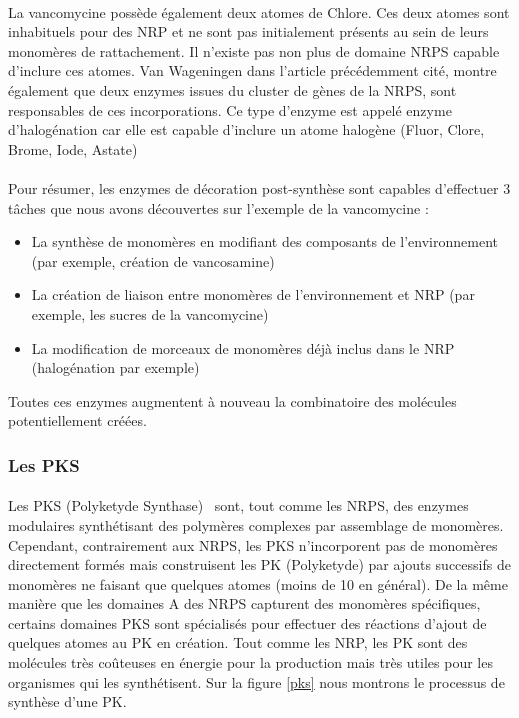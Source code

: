 \documentclass[12pt,french,twoside]{report}
\begin{document}
\paragraph{}La vancomycine possède également deux atomes de Chlore.
Ces deux atomes sont inhabituels pour des NRP et ne sont pas initialement présents au sein de leurs monomères de rattachement.
Il n'existe pas non plus de domaine NRPS capable d'inclure ces atomes.
Van Wageningen dans l'article précédemment cité, montre également que deux enzymes issues du cluster de gènes de la NRPS, sont responsables de ces incorporations.
Ce type d'enzyme est appelé enzyme d'halogénation car elle est capable d'inclure un atome halogène (Fluor, Clore, Brome, Iode, Astate)

\paragraph{}Pour résumer, les enzymes de décoration post-synthèse sont capables d'effectuer 3 tâches que nous avons découvertes sur l'exemple de la vancomycine :
\begin{itemize}
  \item La synthèse de monomères en modifiant des composants de l'environnement (par exemple, création de vancosamine)
  \item La création de liaison entre monomères de l'environnement et NRP (par exemple, les sucres de la vancomycine)
  \item La modification de morceaux de monomères déjà inclus dans le NRP (halogénation par exemple)
\end{itemize}

Toutes ces enzymes augmentent à nouveau la combinatoire des molécules potentiellement créées.



\subsubsection{Les PKS}

\paragraph{}Les PKS (Polyketyde Synthase)~\cite{shen_polyketide_2003,staunton_polyketide_2001} sont, tout comme les NRPS, des enzymes modulaires synthétisant des polymères complexes par assemblage de monomères.
Cependant, contrairement aux NRPS, les PKS n'incorporent pas de monomères directement formés mais construisent les PK (Polyketyde) par ajouts successifs de monomères ne faisant que quelques atomes (moins de 10 en général).
De la même manière que les domaines A des NRPS capturent des monomères spécifiques, certains domaines PKS sont spécialisés pour effectuer des réactions d'ajout de quelques atomes au PK en création.
Tout comme les NRP, les PK sont des molécules très coûteuses en énergie pour la production mais très utiles pour les organismes qui les synthétisent.
Sur la figure \ref{pks} nous montrons le processus de synthèse d'une PK.
\end{document}
